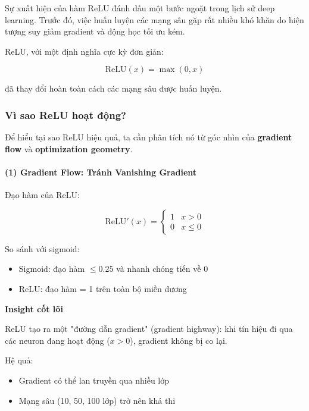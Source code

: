 Sự xuất hiện của hàm ReLU đánh dấu một bước ngoặt trong lịch sử deep learning. Trước đó, việc huấn luyện các mạng sâu gặp rất nhiều khó khăn do hiện tượng suy giảm gradient và động học tối ưu kém.

ReLU, với một định nghĩa cực kỳ đơn giản:

\begin{equation}
	\text{ReLU}(x) = \max(0, x)
\end{equation}

đã thay đổi hoàn toàn cách các mạng sâu được huấn luyện.

\subsubsection*{Vì sao ReLU hoạt động?}

Để hiểu tại sao ReLU hiệu quả, ta cần phân tích nó từ góc nhìn của \textbf{gradient flow} và \textbf{optimization geometry}.

\paragraph{(1) Gradient Flow: Tránh Vanishing Gradient}

Đạo hàm của ReLU:

\[
\text{ReLU}'(x) =
\begin{cases}
	1 & x > 0 \\
	0 & x \le 0
\end{cases}
\]

So sánh với sigmoid:

\begin{itemize}
	\item Sigmoid: đạo hàm $\le 0.25$ và nhanh chóng tiến về 0
	\item ReLU: đạo hàm = 1 trên toàn bộ miền dương
\end{itemize}

\begin{mdframed}[style=infobox]
	\textbf{Insight cốt lõi}
	
	ReLU tạo ra một "đường dẫn gradient" (gradient highway): khi tín hiệu đi qua các neuron đang hoạt động ($x>0$), gradient không bị co lại.
\end{mdframed}

Hệ quả:

\begin{itemize}
	\item Gradient có thể lan truyền qua nhiều lớp
	\item Mạng sâu (10, 50, 100 lớp) trở nên khả thi
\end{itemize}

